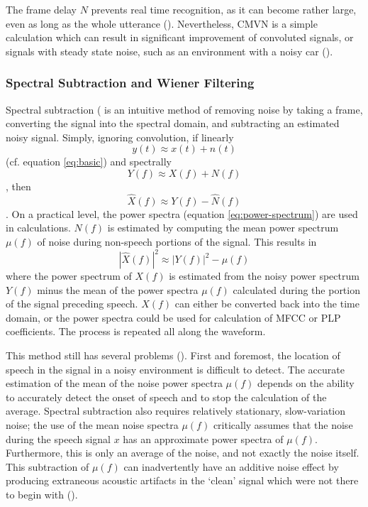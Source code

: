 The frame delay $N$ prevents real time recognition, as it can become rather large, even as long as the whole utterance (\cite{li:14}).  Nevertheless, CMVN is a simple calculation which can result in significant improvement of convoluted signals, or signals with steady state noise, such as an environment with a noisy car (\cite{viikki:98}).

\subsubsection{Spectral Subtraction and Wiener Filtering}\label{sec:spec-sub_wiener}

Spectral subtraction (\cite{boll:79} is an intuitive method of removing noise by taking a frame, converting the signal into the spectral domain, and subtracting an estimated noisy signal. Simply, ignoring convolution, if linearly \begin{equation} y(t) \approx x(t) + n(t) \end{equation} (cf. equation \ref{eq:basic}) and spectrally \begin{equation} Y(f) \approx X(f) + N(f) \end{equation}, then \begin{equation} \hat{X}(f) \approx Y(f) - \hat{N}(f) \end{equation}.  On a practical level, the power spectra (equation \ref{eq:power-spectrum}) are used in calculations.  $N(f)$ is estimated by computing the mean power spectrum $\mu(f)$ of noise during non-speech portions of the signal.  This results in \begin{equation} |\hat{X}(f)|^2 \approx |Y(f)|^2 - \mu(f) \end{equation} where the power spectrum of $X(f)$ is estimated from the noisy power spectrum $Y(f)$ minus the mean of the power spectra $\mu(f)$ calculated during the portion of the signal preceding speech. $X(f)$ can either be converted back into the time domain, or the power spectra could be used for calculation of MFCC or PLP coefficients.  The process is repeated all along the waveform.

This method still has several problems (\cite{li:14}). First and foremost, the location of speech in the signal in a noisy environment is difficult to detect.  The accurate estimation of the mean of the noise power spectra $\mu(f)$ depends on the ability to accurately detect the onset of speech and to stop the calculation of the average.  Spectral subtraction also requires relatively stationary, slow-variation noise; the use of the mean noise spectra $\mu(f)$ critically assumes that the noise during the speech signal $x$ has an approximate power spectra of $\mu(f)$.  Furthermore, this is only an average of the noise, and not exactly the noise itself.  This subtraction of $\mu(f)$ can inadvertently have an additive noise effect by producing extraneous acoustic artifacts in the `clean' signal which were not there to begin with (\cite{berouti:79}).

